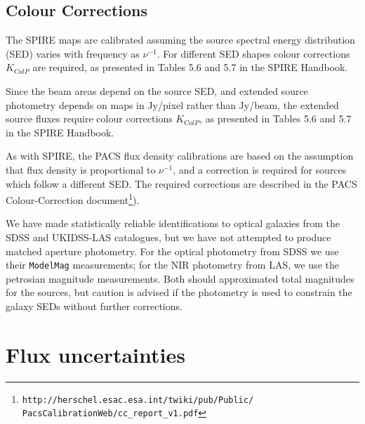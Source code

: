 \documentclass[useAMS,usenatbib]{mn2e}
\begin{document}
\subsection{Colour Corrections} 
 
The SPIRE maps are calibrated assuming the source spectral energy 
distribution (SED)  varies with frequency as $\nu^{-1}$. For different SED
shapes colour corrections $K_{\mathrm ColP}$ are required, as
presented in Tables 5.6 and 5.7 in the SPIRE Handbook. 

Since the beam areas depend on the source SED, and extended source
photometry depends on maps in Jy/pixel rather than Jy/beam, the
extended source fluxes require colour corrections $K_{\mathrm ColP}$,
as presented in Tables 5.6 and 5.7 in the SPIRE Handbook.

As with SPIRE, the PACS flux density calibrations are based on the
assumption that flux density is proportional to $\nu^{-1}$, and
a correction is required for sources which follow a different SED. The
required corrections are described in the PACS Colour-Correction
document\footnote{\tt{http://herschel.esac.esa.int/twiki/pub/Public/
  PacsCalibrationWeb/cc\_report\_v1.pdf}}).

We have made statistically reliable identifications to optical
galaxies from the SDSS and UKIDSS-LAS catalogues, but we have not
attempted to produce matched aperture photometry. For the optical
photometry from SDSS we use their {\tt ModelMag} measurements; for the
NIR photometry from LAS, we use the petrosian magnitude
measurements. Both should approximated total magnitudes for the
sources, but caution is advised if the photometry is used to constrain
the galaxy SEDs without further corrections.

\section{Flux uncertainties} 
\end{document}
